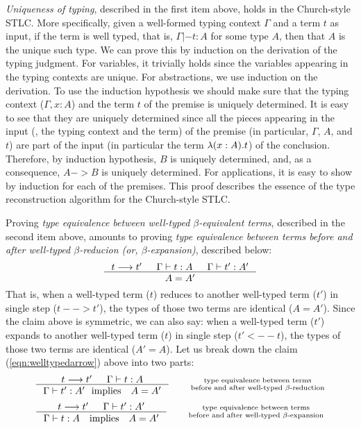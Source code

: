 \emph{Uniqueness of typing}, described in the first item above,
holds in the Church-style STLC.  More specifically, given
a well-formed typing context $\Gamma$ and a term $t$ as input,
if the term is well typed, that is, $\Gamma |- t : A$ for some type $A$,
then that $A$ is the unique such type. We can prove this by induction on
the derivation of the typing judgment.
For variables, it trivially holds since the variables appearing in
the typing contexts are unique.
For abstractions, we use induction on the derivation.
To use the induction hypothesis we should make sure that
the typing context ($\Gamma,x:A$) and the term $t$ of the premise
is uniquely determined. It is easy to see that they are uniquely determined
since all the pieces appearing in the input (\ie, the typing context and
the term) of the premise (in particular, $\Gamma$, $A$, and $t$) are
part of the input (in particular the term $\lambda(x:A).t$) of the conclusion.
Therefore, by induction hypothesis, $B$ is uniquely determined, and,
as a consequence, $A -> B$ is uniquely determined.
For applications, it is easy to show by induction for each of the premises.
This proof describes the essence of the type reconstruction algorithm for
the Church-style STLC.


Proving \emph{type equivalence between well-typed $\beta$-equivalent terms},
described in the second item above, amounts to proving \emph{type equivalence
between terms before and after well-typed $\beta$-reducion
(or, $\beta$-expansion)},
described below:
\begin{align}
\inference{t --> t' & \Gamma |- t : A & \Gamma |- t' : A'}{A = A'}
	\label{eqn:welltypedarrow}
\end{align}
That is, when a well-typed term ($t$) reduces to
another well-typed term ($t'$) in single step ($t --> t'$),
the types of those two terms are identical ($A=A'$).
Since the claim above is symmetric, we can also say: when a well-typed term
($t'$) expands to another well-typed term ($t$) in single step ($t' <-- t$),
the types of those two terms are identical ($A'=A$).
Let us break down the claim (\ref{eqn:welltypedarrow}) above into two parts:
\[
\inference{t --> t' & \Gamma |- t : A}
          {\Gamma |- t' : A' ~~\text{implies}\quad A = A'} \qquad
	\begin{smallmatrix}
		\text{type equivalence between terms} \\
  		\text{before and after well-typed $\beta$-reduction}
	\end{smallmatrix}
\]
\[
\inference{t --> t' & \Gamma |- t' : A'}
          {\Gamma |- t : A \quad\text{implies}\quad A = A'} \qquad
	\begin{smallmatrix}
		\text{type equivalence between terms} \\
  		\text{before and after well-typed $\beta$-expansion}
	\end{smallmatrix}
\]~\vspace*{-3em}\\

